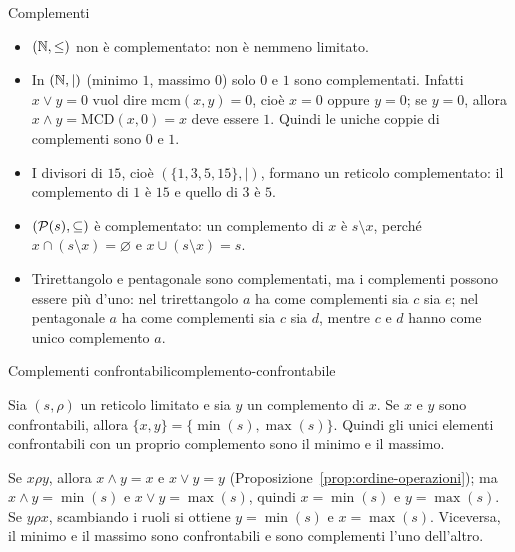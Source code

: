 
\begin{esempio}{Complementi}
    \begin{itemize}
        \item $(\mathbb{N}, \leq)$ non è complementato: non è nemmeno limitato.
        \item In $(\mathbb{N}, \mid)$ (minimo $1$, massimo $0$) solo $0$ e $1$ sono complementati. Infatti $x \vee y = 0$ vuol dire $\mathrm{mcm}(x, y) = 0$, cioè $x = 0$ oppure
              $y = 0$; se $y = 0$, allora $x \wedge y = \mathrm{MCD}(x, 0) = x$ deve essere $1$. Quindi le uniche coppie di complementi sono $0$ e $1$.
        \item I divisori di $15$, cioè $(\{1, 3, 5, 15\}, \mid)$, formano un reticolo complementato: il complemento di $1$ è $15$ e quello di $3$ è $5$.
        \item $(\mathcal{P}(s), \subseteq)$ è complementato: un complemento di $x$ è $s \setminus x$, perché $x \cap (s \setminus x) = \varnothing$ e $x \cup (s \setminus x) = s$.
        \item Trirettangolo e pentagonale sono complementati, ma i complementi possono essere più d'uno: nel trirettangolo $a$ ha come complementi
              sia $c$ sia $e$; nel pentagonale $a$ ha come complementi sia $c$ sia $d$, mentre $c$ e $d$ hanno come unico complemento $a$.
    \end{itemize}
\end{esempio}

\begin{concetto}
\begin{Proposizione}{Complementi confrontabili}{complemento-confrontabile}
    \begin{prerequisiti}
    \end{prerequisiti}
    Sia $(s, \rho)$ un reticolo limitato e sia $y$ un complemento di $x$. Se $x$ e $y$ sono confrontabili, allora $\{x, y\} = \{\min(s), \max(s)\}$. Quindi gli unici
    elementi confrontabili con un proprio complemento sono il minimo e il massimo.
\end{Proposizione}
\begin{dimostrazione}
    Se $x \rho y$, allora $x \wedge y = x$ e $x \vee y = y$ (Proposizione~\ref{prop:ordine-operazioni}); ma $x \wedge y = \min(s)$ e $x \vee y = \max(s)$, quindi $x = \min(s)$
    e $y = \max(s)$. Se $y \rho x$, scambiando i ruoli si ottiene $y = \min(s)$ e $x = \max(s)$. Viceversa, il minimo e il massimo sono confrontabili e sono
    complementi l'uno dell'altro.
\end{dimostrazione}
\end{concetto}

